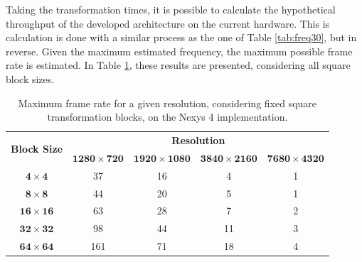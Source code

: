 Taking the transformation times, it is possible to calculate the hypothetical throughput of the developed architecture on the current hardware. %
This is calculation is done with a similar process as the one of Table \ref{tab:freq30}, but in reverse. Given the maximum estimated frequency, the maximum possible frame rate is estimated. In Table \ref{tab:maxfps}, these results are presented, considering all square block sizes.


\begin{table}[!htpb]
    \centering
    \caption{Maximum frame rate for a given resolution, considering fixed square transformation blocks, on the Nexys 4 implementation.}
    \begin{tabular}{ccccc} \toprule
        \multirow{2}{*}{\textbf{Block Size}}   & \multicolumn{4}{c}{\textbf{Resolution}}                      \\
                                         & $\mathbf{1280\times 720}$    & $\mathbf{1920\times 1080}$  & $\mathbf{3840\times 2160}$  & $\mathbf{7680\times 4320}$  \\ \toprule
        $\mathbf{4\times 4}$                       & 37                      & 16                   & 4                    & 1  \\
        $\mathbf{8\times 8}$                       & 44                      & 20                   & 5                    & 1  \\
        $\mathbf{16\times 16}$                      & 63                      & 28                   & 7                    & 2  \\
        $\mathbf{32\times 32}$                      & 98                      & 44                   & 11                   & 3  \\
        $\mathbf{64\times 64}$                      & 161                     & 71                   & 18                   & 4  \\
        \bottomrule
    \end{tabular}    
    \label{tab:maxfps}
\end{table}

